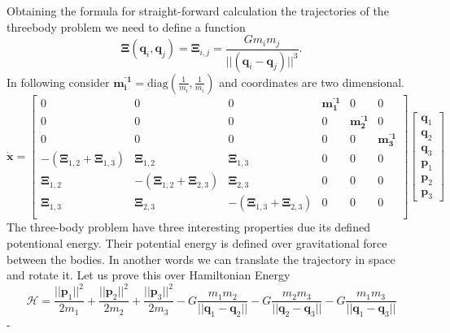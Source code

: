 Obtaining the formula for straight-forward calculation the trajectories of the threebody problem we need to define a function
\begin{equation}
	\boldsymbol{\Xi}(\mathbf{q}_i,\mathbf{q}_j)=\boldsymbol{\Xi}_{i,j}=\frac{Gm_im_j}{||(\mathbf{q}_i-\mathbf{q}_j)||^3}.
\end{equation}
In following consider $\mathbf{m_i^{⁻1}}=\text{diag}(\frac{1}{m_i},\frac{1}{m_i})$ and coordinates are two dimensional.
\begin{equation}
	\dot{\mathbf{x}} = 
	\begin{bmatrix}
		0 & 0 & 0 & \mathbf{m_1^{⁻1}} & 0 & 0\\
		0 & 0 & 0 & 0 & \mathbf{m_2^{⁻1}} & 0\\
		0 & 0 & 0 & 0 & 0 & \mathbf{m_3^{⁻1}}\\
		-(\boldsymbol{\Xi}_{1,2}+\boldsymbol{\Xi}_{1,3}) & \boldsymbol{\Xi}_{1,2} & \boldsymbol{\Xi}_{1,3} & 0 & 0 & 0\\
		\boldsymbol{\Xi}_{1,2} & -(\boldsymbol{\Xi}_{1,2}+\boldsymbol{\Xi}_{2,3}) & \boldsymbol{\Xi}_{2,3} & 0 & 0 & 0\\
		\boldsymbol{\Xi}_{1,3} & \boldsymbol{\Xi}_{2,3} & -(\boldsymbol{\Xi}_{1,3}+\boldsymbol{\Xi}_{2,3}) & 0 & 0 & 0\\
	\end{bmatrix}
	\begin{bmatrix}
		\mathbf{q}_1\\
		\mathbf{q}_2\\
		\mathbf{q}_3\\
		\mathbf{p}_1\\
		\mathbf{p}_2\\
		\mathbf{p}_3
	\end{bmatrix}
\end{equation}
The three-body problem have three interesting properties due its defined potentional energy. Their potential energy is defined over gravitational force between the bodies. In another words we can translate the trajectory in space and rotate it. Let us prove this over Hamiltonian Energy
\begin{equation}
	\mathcal{H} = \frac{||\mathbf{p}_1||^2}{2m_1} +\frac{||\mathbf{p}_2||^2}{2m_2}+\frac{||\mathbf{p}_3||^2}{2m_3} - G\frac{m_1m_2}{||\mathbf{q}_1 - \mathbf{q}_2||}-G\frac{m_2m_3}{||\mathbf{q}_2 - \mathbf{q}_3||}-G\frac{m_1m_3}{||\mathbf{q}_1 - \mathbf{q}_3||} 
\end{equation}-
